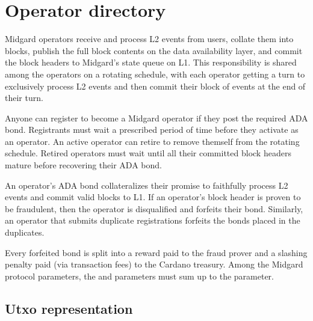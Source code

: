 \documentclass[../midgard.tex]{subfiles}
\begin{document}

\section{Operator directory}
\label{h:operator-directory}

Midgard operators receive and process L2 events from users, collate them into blocks, publish the full block contents on the data availability layer, and commit the block headers to Midgard's state queue on L1.
This responsibility is shared among the operators on a rotating schedule, with each operator getting a turn to exclusively process L2 events and then commit their block of events at the end of their turn.

Anyone can register to become a Midgard operator if they post the required ADA bond.
Registrants must wait a prescribed period of time before they activate as an operator.
An active operator can retire to remove themself from the rotating schedule.
Retired operators must wait until all their committed block headers mature before recovering their ADA bond.

An operator's ADA bond collateralizes their promise to faithfully process L2 events and commit valid blocks to L1.
If an operator's block header is proven to be fraudulent, then the operator is disqualified and forfeits their bond.
Similarly, an operator that submits duplicate registrations forfeits the bonds placed in the duplicates.

Every forfeited bond is split into a reward paid to the fraud prover and a slashing penalty paid (via transaction fees) to the Cardano treasury.
Among the Midgard protocol parameters, the  and  parameters must sum up to the  parameter.

\subsection{Utxo representation}
\label{h:operator-directory-utxo-representation}
\end{document}
